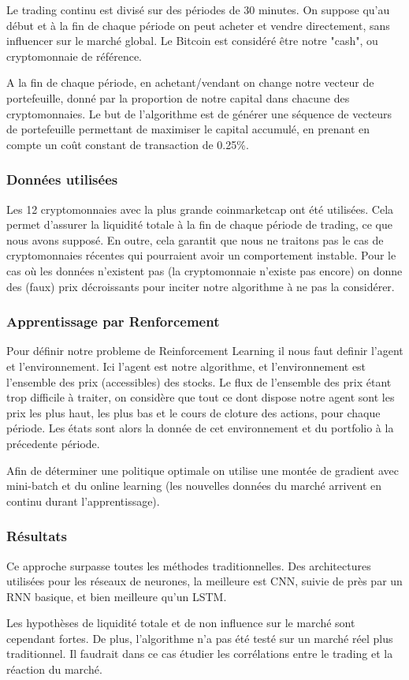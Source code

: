 \documentclass[a4paper]{article}
\begin{document}
Le trading continu est divisé sur des périodes de 30 minutes. On suppose qu'au début et à la fin de chaque période on peut acheter et vendre directement, sans influencer sur le marché global. Le Bitcoin est considéré être notre "cash", ou cryptomonnaie de référence. 

A la fin de chaque période, en achetant/vendant on change notre vecteur de portefeuille, donné par la proportion de notre capital dans chacune des cryptomonnaies. Le but de l'algorithme est de générer une séquence de vecteurs de portefeuille permettant de maximiser le capital accumulé, en prenant en compte un coût constant de transaction de 0.25\%.

\subsubsection{Données utilisées}

Les 12 cryptomonnaies avec la plus grande coinmarketcap ont été utilisées. Cela permet d'assurer la liquidité totale à la fin de chaque période de trading, ce que nous avons supposé. En outre, cela garantit que nous ne traitons pas le cas de cryptomonnaies récentes qui pourraient avoir un comportement instable. Pour le cas où les données n'existent pas (la cryptomonnaie n'existe pas encore) on donne des (faux) prix décroissants pour inciter notre algorithme à ne pas la considérer.

\subsubsection{Apprentissage par Renforcement}

Pour définir notre probleme de Reinforcement Learning il nous faut definir l'agent et l'environnement. Ici l'agent est notre algorithme, et l'environnement est l'ensemble des prix (accessibles) des stocks. Le flux de l'ensemble des prix étant trop difficile à traiter, on considère que tout ce dont dispose notre agent sont les prix les plus haut, les plus bas et le cours de cloture des actions, pour chaque période. Les états sont alors la donnée de cet environnement et du portfolio à la précedente période.

Afin de déterminer une politique optimale on utilise une montée de gradient avec mini-batch et du online learning (les nouvelles données du marché arrivent en continu durant l'apprentissage).

\subsubsection{Résultats}

Ce approche surpasse toutes les méthodes traditionnelles. Des architectures utilisées pour les réseaux de neurones, la meilleure est CNN, suivie de près par un RNN basique, et bien meilleure qu'un LSTM.

Les hypothèses de liquidité totale et de non influence sur le marché sont cependant fortes. De plus, l'algorithme n'a pas été testé sur un marché réel plus traditionnel. Il faudrait dans ce cas étudier les corrélations entre le trading et la réaction du marché.

\nocite{*}
\printbibliography
\end{document}
